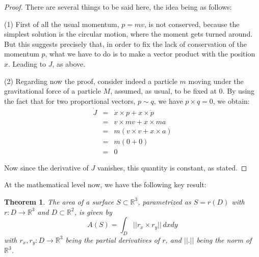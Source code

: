 \documentclass[12pt]{amsbook}
\newtheorem{theorem}{Theorem}[chapter]
\begin{document}
\begin{proof}
There are several things to be said here, the idea being as follows:

\medskip

(1) First of all the usual momentum, $p=mv$, is not conserved, because the simplest solution is the circular motion, where the moment gets turned around. But this suggests precisely that, in order to fix the lack of conservation of the momentum $p$, what we have to do is to make a vector product with the position $x$. Leading to $J$, as above.

\medskip

(2) Regarding now the proof, consider indeed a particle $m$ moving under the gravitational force of a particle $M$, assumed, as usual, to be fixed at 0. By using the fact that for two proportional vectors, $p\sim q$, we have $p\times q=0$, we obtain:
\begin{eqnarray*}
\dot{J}
&=&\dot{x}\times p+x\times\dot{p}\\
&=&v\times mv+x\times ma\\
&=&m(v\times v+x\times a)\\
&=&m(0+0)\\
&=&0
\end{eqnarray*}

Now since the derivative of $J$ vanishes, this quantity is constant, as stated.
\end{proof}

At the mathematical level now, we have the following key result:

\begin{theorem}
The area of a surface $S\subset\mathbb R^3$, parametrized as $S=r(D)$ with $r:D\to\mathbb R^3$ and $D\subset\mathbb R^2$, is given by
$$A(S)=\int_D||r_x\times r_y||\,dxdy$$
with $r_x,r_y:D\to\mathbb R^3$ being the partial derivatives of $r$, and $||.||$ being the norm of $\mathbb R^3$.
\end{theorem}
\end{document}
